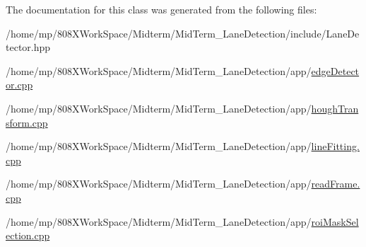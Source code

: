 The documentation for this class was generated from the following files\+:\begin{DoxyCompactItemize}
\item 
/home/mp/808\+X\+Work\+Space/\+Midterm/\+Mid\+Term\+\_\+\+Lane\+Detection/include/Lane\+Detector.\+hpp\item 
/home/mp/808\+X\+Work\+Space/\+Midterm/\+Mid\+Term\+\_\+\+Lane\+Detection/app/\hyperlink{edgeDetector_8cpp}{edge\+Detector.\+cpp}\item 
/home/mp/808\+X\+Work\+Space/\+Midterm/\+Mid\+Term\+\_\+\+Lane\+Detection/app/\hyperlink{houghTransform_8cpp}{hough\+Transform.\+cpp}\item 
/home/mp/808\+X\+Work\+Space/\+Midterm/\+Mid\+Term\+\_\+\+Lane\+Detection/app/\hyperlink{lineFitting_8cpp}{line\+Fitting.\+cpp}\item 
/home/mp/808\+X\+Work\+Space/\+Midterm/\+Mid\+Term\+\_\+\+Lane\+Detection/app/\hyperlink{readFrame_8cpp}{read\+Frame.\+cpp}\item 
/home/mp/808\+X\+Work\+Space/\+Midterm/\+Mid\+Term\+\_\+\+Lane\+Detection/app/\hyperlink{roiMaskSelection_8cpp}{roi\+Mask\+Selection.\+cpp}\end{DoxyCompactItemize}
